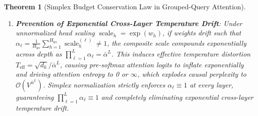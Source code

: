 \documentclass{article}
\newtheorem{theorem}{Theorem}
\begin{document}
\begin{theorem}[Simplex Budget Conservation Law in Grouped-Query Attention]
\begin{enumerate}
    where the lower bound is attained if and only if all heads receive equal weights ($\operatorname{scale}_h \equiv 1$), and the upper bound is attained in the extreme degenerate corner of the simplex where a single head concentrates all weight ($\operatorname{scale}_h = H_{\text{kv}}$).
    \item \textbf{Prevention of Exponential Cross-Layer Temperature Drift}: Under unnormalized head scaling $\operatorname{scale}_h = \exp(w_h)$, if weights drift such that $\alpha_\ell = \frac{1}{H_{\text{kv}}} \sum_{h=1}^{H_{\text{kv}}} \operatorname{scale}_h^{(\ell)} \ne 1$, the composite scale compounds exponentially across depth as $\prod_{\ell=1}^L \alpha_\ell = \bar{\alpha}^L$. This induces effective temperature distortion $T_{\text{eff}} = \sqrt{d_k} / \bar{\alpha}^L$, causing pre-softmax attention logits to inflate exponentially and driving attention entropy to 0 or $\infty$, which explodes causal perplexity to $\mathcal{O}(V^{\bar{\alpha}^L})$. Simplex normalization strictly enforces $\alpha_\ell \equiv 1$ at every layer, guaranteeing $\prod_{\ell=1}^L \alpha_\ell \equiv 1$ and completely eliminating exponential cross-layer temperature drift.
\end{enumerate}
\end{theorem}
\end{document}

